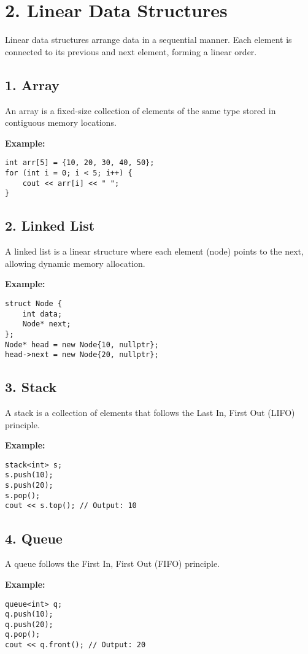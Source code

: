 \section*{\Large \textbf{2. Linear Data Structures}}

Linear data structures arrange data in a sequential manner. Each element is connected to its previous and next element, forming a linear order.

\subsection*{\textbf{1. Array}}
An array is a fixed-size collection of elements of the same type stored in contiguous memory locations.

\textbf{Example:}
\begin{lstlisting}
int arr[5] = {10, 20, 30, 40, 50};
for (int i = 0; i < 5; i++) {
    cout << arr[i] << " ";
}
\end{lstlisting}

\subsection*{\textbf{2. Linked List}}
A linked list is a linear structure where each element (node) points to the next, allowing dynamic memory allocation.

\textbf{Example:}
\begin{lstlisting}
struct Node {
    int data;
    Node* next;
};
Node* head = new Node{10, nullptr};
head->next = new Node{20, nullptr};
\end{lstlisting}

\subsection*{\textbf{3. Stack}}
A stack is a collection of elements that follows the Last In, First Out (LIFO) principle.

\textbf{Example:}
\begin{lstlisting}
stack<int> s;
s.push(10);
s.push(20);
s.pop();
cout << s.top(); // Output: 10
\end{lstlisting}

\subsection*{\textbf{4. Queue}}
A queue follows the First In, First Out (FIFO) principle.

\textbf{Example:}
\begin{lstlisting}
queue<int> q;
q.push(10);
q.push(20);
q.pop();
cout << q.front(); // Output: 20
\end{lstlisting}

